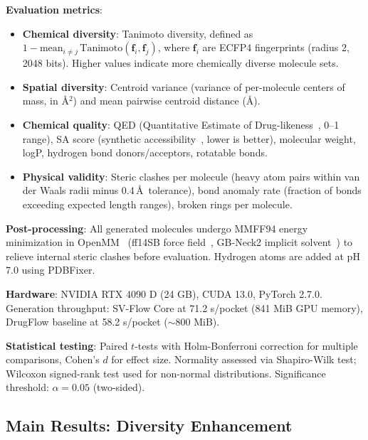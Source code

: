 \documentclass[a4paper,11pt]{article}
\begin{document}
\textbf{Evaluation metrics}:
\begin{itemize}
  \item \textbf{Chemical diversity}: Tanimoto diversity, defined as $1 -
    \text{mean}_{i \neq j}\, \text{Tanimoto}(\mathbf{f}_i, \mathbf{f}_j)$, where
    $\mathbf{f}_i$ are ECFP4 fingerprints (radius 2, 2048 bits).  Higher values
    indicate more chemically diverse molecule sets.
  \item \textbf{Spatial diversity}: Centroid variance (variance of per-molecule
    centers of mass, in \AA$^2$) and mean pairwise centroid distance (\AA).
  \item \textbf{Chemical quality}: QED (Quantitative Estimate of
    Drug-likeness~\cite{bickerton2012}, 0--1 range), SA score (synthetic
    accessibility~\cite{ertl2009}, lower is better), molecular weight, logP,
    hydrogen bond donors/acceptors, rotatable bonds.
  \item \textbf{Physical validity}: Steric clashes per molecule (heavy atom
    pairs within van der Waals radii minus 0.4\,\AA\ tolerance), bond anomaly
    rate (fraction of bonds exceeding expected length ranges), broken rings per
    molecule.
\end{itemize}

\textbf{Post-processing}: All generated molecules undergo MMFF94 energy
minimization in OpenMM~\cite{eastman2017} (ff14SB force
field~\cite{maier2015ff14sb}, GB-Neck2 implicit solvent~\cite{nguyen2013gb}) to
relieve internal steric clashes before evaluation.  Hydrogen atoms are added at
pH 7.0 using PDBFixer.

\textbf{Hardware}: NVIDIA RTX 4090 D (24 GB), CUDA 13.0, PyTorch 2.7.0.
Generation throughput: SV-Flow Core at 71.2 s/pocket (841 MiB GPU memory),
DrugFlow baseline at 58.2 s/pocket ($\sim$800 MiB).

\textbf{Statistical testing}: Paired $t$-tests with Holm-Bonferroni correction
for multiple comparisons, Cohen's $d$ for effect size.  Normality assessed via
Shapiro-Wilk test; Wilcoxon signed-rank test used for non-normal distributions.
Significance threshold: $\alpha = 0.05$ (two-sided).

\subsection{Main Results: Diversity Enhancement}
\end{document}
